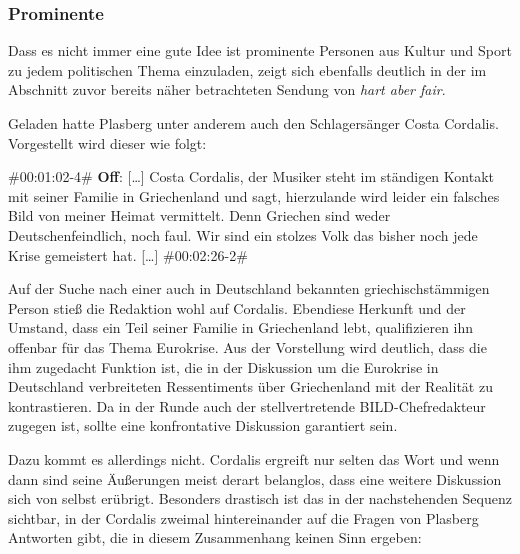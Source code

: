 \subsubsection{Prominente}

Dass es nicht immer eine gute Idee ist prominente Personen aus Kultur und Sport zu jedem politischen Thema einzuladen, zeigt sich ebenfalls deutlich in der im Abschnitt zuvor bereits näher betrachteten Sendung von \textit{hart aber fair}.

Geladen hatte Plasberg unter anderem auch den Schlagersänger Costa Cordalis. Vorgestellt wird dieser wie folgt:

\begin{description}
	\begin{linenumbers}[1]
		\item \#00:01:02-4\# \textbf{Off}: [\ldots] Costa Cordalis, der Musiker steht im ständigen Kontakt mit seiner Familie in Griechenland und sagt, hierzulande wird leider ein falsches Bild von meiner Heimat vermittelt. Denn Griechen sind weder Deutschenfeindlich, noch faul. Wir sind ein stolzes Volk das bisher noch jede Krise gemeistert hat. [\ldots] \#00:02:26-2\#
	\end{linenumbers}
\end{description}

Auf der Suche nach einer auch in Deutschland bekannten griechischstämmigen Person stieß die Redaktion wohl auf Cordalis. Ebendiese Herkunft und der Umstand, dass ein Teil seiner Familie in Griechenland lebt, qualifizieren ihn offenbar für das Thema Eurokrise. Aus der Vorstellung wird deutlich, dass die ihm zugedacht Funktion ist, die in der Diskussion um die Eurokrise in Deutschland verbreiteten Ressentiments über Griechenland mit der Realität zu kontrastieren. Da in der Runde auch der stellvertretende BILD-Chefredakteur zugegen ist, sollte eine konfrontative Diskussion garantiert sein.

Dazu kommt es allerdings nicht. Cordalis ergreift nur selten das Wort und wenn dann sind seine Äußerungen meist derart belanglos, dass eine weitere Diskussion sich von selbst erübrigt. Besonders drastisch ist das in der nachstehenden Sequenz sichtbar, in der Cordalis zweimal hintereinander auf die Fragen von Plasberg Antworten gibt, die in diesem Zusammenhang keinen Sinn ergeben:

